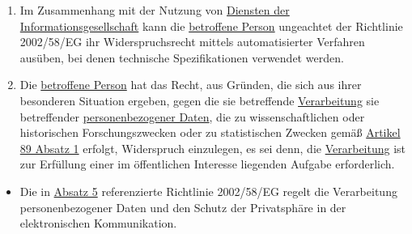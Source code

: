 \begin{enumerate}
  \item Im Zusammenhang mit der Nutzung von \hyperref[itm:04-25]{Diensten der Informationsgesellschaft} kann
   die \hyperref[itm:04-1]{betroffene Person} ungeachtet der Richtlinie 2002/58/EG ihr Widerspruchsrecht mittels
   automatisierter Verfahren ausüben, bei denen technische Spezifikationen verwendet werden.%
  \label{itm:21-5}

  \item Die \hyperref[itm:04-1]{betroffene Person} hat das Recht, aus Gründen, die sich aus ihrer besonderen Situation
   ergeben, gegen die sie betreffende \hyperref[itm:04-2]{Verarbeitung} sie betreffender \hyperref[itm:04-1]
   {personenbezogener Daten}, die zu wissenschaftlichen oder historischen Forschungszwecken oder zu statistischen
   Zwecken gemäß \hyperref[itm:89-1]{Artikel 89 Absatz 1} erfolgt, Widerspruch einzulegen, es sei denn, die \hyperref
   [itm:04-2]{Verarbeitung} ist zur Erfüllung einer im öffentlichen Interesse liegenden Aufgabe erforderlich.%
  \label{itm:21-6}

\end{enumerate}


\begin{itemize}

  \item Die in \hyperref[itm:21-5]{Absatz 5} referenzierte Richtlinie 2002/58/EG \cite{ril-ds-ek} regelt die
   Verarbeitung personenbezogener Daten und den Schutz der Privatsphäre in der elektronischen Kommunikation.

\end{itemize}





